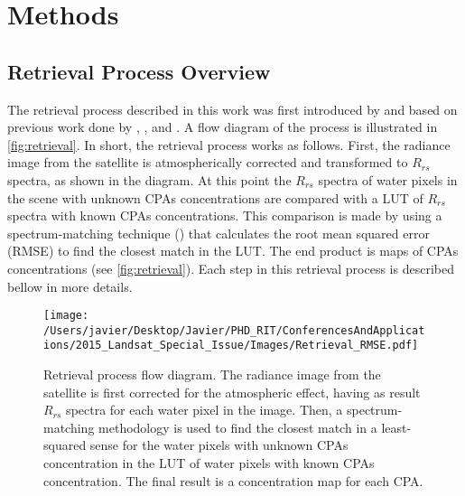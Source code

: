 \documentclass[onecolumn,3p]{elsarticle}
\begin{document}
\section{Methods}
\subsection{Retrieval Process Overview}
The retrieval process described in this work was first introduced by \cite*{Concha2013IGARSS} and based on previous work done by \cite{Raqueno:2000}, \cite{Gerace:2012}, \cite{Pahlevan:2012} and \cite{Gerace:2013}. A flow diagram of the process is illustrated in \autoref{fig:retrieval}. In short, the retrieval process works as follows. First, the radiance image from the satellite is atmospherically corrected and transformed to $R_{rs}$ spectra, as shown in the diagram. At this point the $R_{rs}$ spectra of water pixels in the scene with unknown CPAs concentrations are compared with a LUT of $R_{rs}$ spectra with known CPAs concentrations. This comparison is made by using a spectrum-matching technique (\cite{Raqueno:2000,Mobley:2005}) that calculates the root mean squared error (RMSE) to find the closest match in the LUT. The end product is maps of CPAs concentrations (see \autoref{fig:retrieval}). Each step in this retrieval process is described bellow in more details.

\begin{figure}[!ht]
	\centering
    \texttt{[image: /Users/javier/Desktop/Javier/PHD\_RIT/ConferencesAndApplications/2015\_Landsat\_Special\_Issue/Images/Retrieval\_RMSE.pdf]}
    \caption{Retrieval process flow diagram. The radiance image from the satellite is first corrected for the atmospheric effect, having as result $R_{rs}$ spectra for each water pixel in the image. Then, a spectrum-matching methodology is used to find the closest match in a least-squared sense for the water pixels with unknown CPAs concentration in the LUT of water pixels with known CPAs concentration. The final result is a concentration map for each CPA.  \label{fig:retrieval} }
\end{figure}

\end{document}
